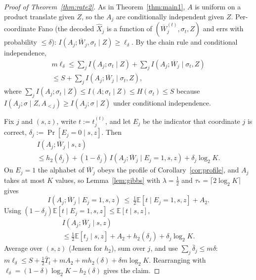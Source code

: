 \documentclass[aps,prx,twocolumn,superscriptaddress,nofootinbib,longbibliography]{revtex4-2}
\theoremstyle{plain}
\theoremstyle{definition}
\theoremstyle{remark}
\newcommand{\E}{\mathbb{E}}
\begin{document}
\begin{proof}[Proof of Theorem~\ref{thm:rate2}]
As in Theorem~\ref{thm:main1}, $A$ is uniform on a product translate given $Z$, so the $A_j$ are conditionally independent given $Z$. Per-coordinate Fano (the decoded $\hat X_j$ is a function of $(\overline W^{(t)}_j,\sigma_t,Z)$ and errs with probability $\le\delta$): $I(A_j;\overline W_j,\sigma_t\mid Z)\ge\ell_\delta$. By the chain rule and conditional independence,
\begin{multline}\label{eq:chain}
m\ell_\delta\le\sum_jI(A_j;\sigma_t\mid Z)+\sum_jI(A_j;\overline W_j\mid\sigma_t,Z)\\
\le S+\sum_jI(A_j;\overline W_j\mid\sigma_t,Z),
\end{multline}
where $\sum_jI(A_j;\sigma_t\mid Z)\le I(A;\sigma_t\mid Z)\le H(\sigma_t)\le S$ because $I(A_j;\sigma\mid Z,A_{<j})\ge I(A_j;\sigma\mid Z)$ under conditional independence.

Fix $j$ and $(s,z)$, write $t:=t^{(t)}_j$, and let $E_j$ be the indicator that coordinate $j$ is correct, $\delta_j:=\Pr[E_j=0\mid s,z]$. Then
\begin{multline}
I(A_j;\overline W_j\mid s,z)\\
\le h_2(\delta_j)+(1-\delta_j)\,I(A_j;\overline W_j\mid E_j=1,s,z)+\delta_j\log_2K.
\end{multline}
On $E_j=1$ the alphabet of $\overline W_j$ obeys the profile of Corollary~\ref{cor:profile}, and $A_j$ takes at most $K$ values, so Lemma~\ref{lem:gibbs} with $\lambda=\tfrac12$ and $\tau_*=\lceil2\log_2K\rceil$ gives
\begin{equation}
I(A_j;\overline W_j\mid E_j=1,s,z)\ \le\ \tfrac12\E[t\mid E_j=1,s,z]+A_2 .
\end{equation}
Using $(1-\delta_j)\E[t\mid E_j=1,s,z]\le\E[t\mid s,z]$,
\begin{multline}
I(A_j;\overline W_j\mid s,z)\\
\le\tfrac12\E[t_j\mid s,z]+A_2+h_2(\delta_j)+\delta_j\log_2K.
\end{multline}
Average over $(s,z)$ (Jensen for $h_2$), sum over $j$, and use $\sum_j\bar\delta_j\le m\delta$: $m\ell_\delta\le S+\tfrac12\bar T_t+mA_2+mh_2(\delta)+\delta m\log_2K$. Rearranging with $\ell_\delta=(1-\delta)\log_2K-h_2(\delta)$ gives the claim.
\end{proof}
\end{document}
